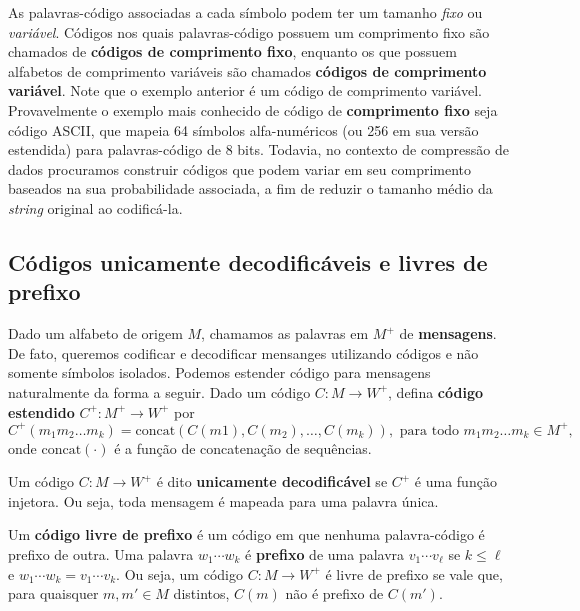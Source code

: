 As palavras-código associadas a cada símbolo podem ter um tamanho \emph{fixo} ou \emph{variável}.
Códigos nos quais palavras-código possuem um comprimento fixo são chamados de \textbf{códigos de comprimento fixo}, enquanto os que possuem alfabetos de comprimento variáveis são chamados \textbf{códigos de comprimento variável}. Note que o exemplo anterior é um código de comprimento variável. 
Provavelmente o exemplo mais conhecido de código de \textbf{comprimento fixo} seja código ASCII, que mapeia 64 símbolos alfa-numéricos (ou 256 em sua versão estendida) para palavras-código de 8 bits. 
Todavia, no contexto de compressão de dados procuramos construir códigos que podem variar em seu comprimento baseados na sua probabilidade associada, a fim de reduzir o tamanho médio da \emph{string} original ao codificá-la.

\subsection{Códigos unicamente decodificáveis e livres de prefixo}

Dado um alfabeto de origem $M$, chamamos as palavras em $M^+$ de
\textbf{mensagens}. De fato, queremos codificar e decodificar
mensanges utilizando códigos e não somente símbolos isolados. Podemos
estender código para mensagens naturalmente da forma a seguir. Dado um
código $C\colon M\to W^+$, defina \textbf{código estendido} $C^+: M^+\to W^+$ por
\begin{equation*}
  C^+(m_1m_2\dotsc m_k) =
  \textrm{concat}(C(m1),C(m_2),\dotsc,C(m_k)), \text{ para todo }m_1m_2\dotsc m_k\in M^+,
\end{equation*}
onde $\textrm{concat}(\cdot)$ é a função de concatenação de sequências.


Um código $C\colon M\to W^+$ é dito \textbf{unicamente decodificável}
se $C^+$ é uma função injetora. Ou seja, toda mensagem é mapeada para
uma palavra única.

Um \textbf{código livre de prefixo} é um código em que nenhuma
palavra-código é prefixo de outra. Uma palavra $w_1\dotsm w_k$ é
\textbf{prefixo} de uma palavra $v_1\dotsm v_\ell$ se $k\leq \ell$ e
$w_1\dotsm w_k = v_1\dotsm v_k$. Ou seja, um código $C\colon M\to W^+$
é livre de prefixo se vale que, para quaisquer $m,m' \in M$ distintos,
$C(m)$ não é prefixo de $C(m')$.

